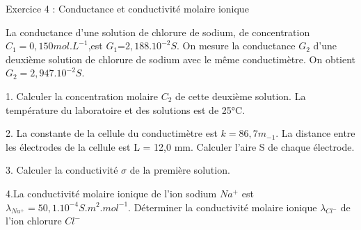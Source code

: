 \documentclass[12pt, french]{article}
\begin{document}
\begin{Box2}{Exercice 4 : Conductance et conductivité molaire ionique}

   La conductance d’une solution de chlorure de sodium, de concentration $C_1=0,150 mol.L^{-1}$,est $G_1$=$2,188.10^{-2}S$. On mesure la conductance $G_2$ d’une deuxième solution de chlorure de sodium avec le même conductimètre. On obtient $G_2= 2,947.10^{-2} S$. 
   
   1. Calculer la concentration molaire $C_2$ de cette deuxième solution. La température du laboratoire et des solutions est de 25°C.

   2. La constante de la cellule du conductimètre est $k = 86,7 m_{-1}$. La distance entre les électrodes de la cellule est L = 12,0 mm. Calculer l’aire S de chaque électrode.

   3. Calculer la conductivité $\sigma$ de la première solution.

   4.La conductivité molaire ionique de l’ion sodium $Na^+$ est $\lambda_{Na^+} = 50,1.10^{-4} S.m^2.mol^{-1}.$ Déterminer la conductivité molaire ionique $\lambda_{Cl^-}$ de l’ion chlorure $Cl^-$
\end{Box2}
\end{document}
